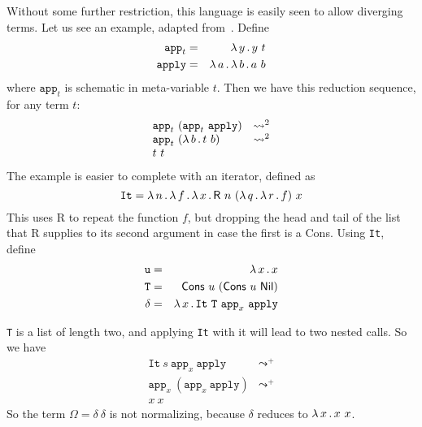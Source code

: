 \documentclass{article}
\begin{document}
\noindent Without some further restriction, this language is
easily seen to allow diverging terms.  Let us see an example, adapted
from~\cite{alves10}.  Define
\begin{eqnarray*}
  \texttt{app}_t & = & \lambda\, y\, .\, y\ t \\
  \texttt{apply} & = & \lambda\, a\, .\, \lambda\, b\, .\, a\ b \\
\end{eqnarray*}
\noindent where $\texttt{app}_t$ is schematic in meta-variable $t$. Then we have this reduction sequence, for any term $t$:
\[
\begin{array}{ll}
  \texttt{app}_t\ (\texttt{app}_t\ \texttt{apply}) & \leadsto^2 \\
  \texttt{app}_t\ (\lambda\, b\, .\, t\ b) & \leadsto^2 \\
  t\ t& \
  \end{array}
\]
\noindent The example is easier to complete with an iterator, defined as
\[
\texttt{It} = \lam{n}{\lam{f}{\lam{x}{\mathsf{R}\ n\ (\lam{q}{\lam{r}{f}})\ x}}}
\]
\noindent This uses \textsf{R} to repeat the function $f$, but dropping the head
and tail of the list that \textsf{R} supplies to its second argument in case the first is a \textsf{Cons}.  Using \texttt{It}, define
\begin{eqnarray*}
\texttt{u} & = & \lam{x}{x} \\
\texttt{T} & = & \mathsf{Cons}\ u\ (\mathsf{Cons}\ u\ \mathsf{Nil}) \\
\delta & = & \lam{x}{\texttt{It}\ \texttt{T}\ \texttt{app}_x\ \texttt{apply}}
\end{eqnarray*}

\noindent \texttt{T} is a list of length two, and applying \texttt{It} with it
will lead to two nested calls.  So we have
\[
\begin{array}{ll}
  \texttt{It}\ s\ \texttt{app}_x\ \texttt{apply} & \leadsto^+ \\
  \texttt{app}_x\ (\texttt{app}_x\ \texttt{apply}) & \leadsto^+ \\
  x\ x& \
\end{array}
\]
\noindent So the term $\Omega = \delta\ \delta$ is not normalizing, 
because $\delta$ reduces to $\lambda\, x\, .\, x\ x$.
\end{document}
